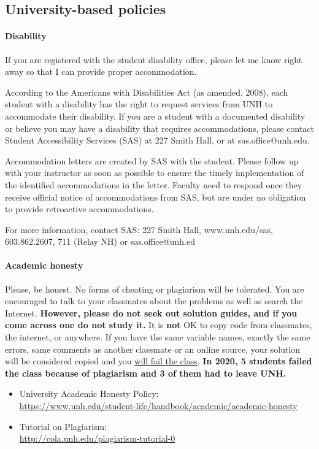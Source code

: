 \documentclass[11pt]{article}
\begin{document}
\subsection{University-based policies}

\paragraph{Disability}

If you are registered with the student disability office, please let me know right away so that I can provide proper accommodation.

According to the Americans with Disabilities Act (as amended, 2008), each student
with a disability has the right to request services from UNH to accommodate their
disability. If you are a student with a documented disability or believe you may
have a disability that requires accommodations, please contact Student Accessibility Services (SAS) at 227 Smith Hall, or at sas.office@unh.edu.

Accommodation letters are created by SAS with the student. Please follow up with
your instructor as soon as possible to ensure the timely implementation of the identified accommodations in the letter. Faculty need to respond once they receive official notice of accommodations from SAS, but are under no obligation to provide retroactive accommodations.

For more information, contact SAS: 227 Smith Hall, www.unh.edu/sas,
603.862.2607, 711 (Relay NH) or sas.office@unh.ed

\paragraph{Academic honesty}

Please, be honest. No forms of cheating or plagiarism will be tolerated. You are encouraged to talk to your classmates about the problems as well as search the Internet. \textbf{However, please do not seek out solution guides, and if you come across one do not study it.} It is \textbf{not} OK to copy code from classmates, the internet, or anywhere. If you have the same variable names, exactly the same errors, same comments as another classmate or an online source, your solution will be considered copied and you \underline{will fail the class}.  \textbf{In 2020, 5 students failed the class because of plagiarism and 3 of them had to leave UNH.}

\begin{itemize}[noitemsep]
\item University Academic Honesty Policy:\\
     \url{https://www.unh.edu/student-life/handbook/academic/academic-honesty}
\item Tutorial on Plagiarism: \\
    \url{http://cola.unh.edu/plagiarism-tutorial-0}
\end{itemize}
\end{document}

